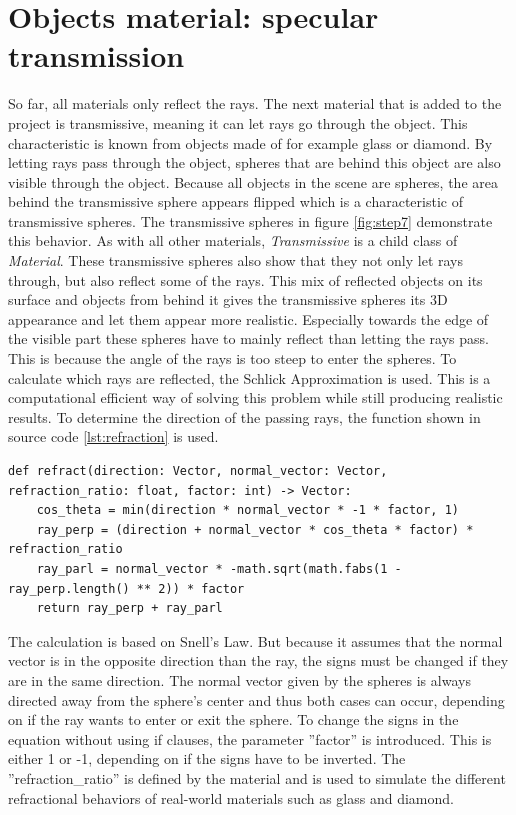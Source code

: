 \documentclass[12pt]{report}
\begin{document}
\chapter{Objects material: specular transmission}
\vspace*{-0.1cm}
So far, all materials only reflect the rays. The next material that is added to the project is transmissive, meaning it can let rays go through the object. This characteristic is known from objects made of for example glass or diamond. By letting rays pass through the object, spheres that are behind this object are also visible through the object. Because all objects in the scene are spheres, the area behind the transmissive sphere appears flipped which is a characteristic of transmissive spheres. The transmissive spheres in figure \ref{fig:step7} demonstrate this behavior. As with all other materials, \textit{Transmissive} is a child class of \textit{Material}. These transmissive spheres also show that they not only let rays through, but also reflect some of the rays. This mix of reflected objects on its surface and objects from behind it gives the transmissive spheres its 3D appearance and let them appear more realistic. Especially towards the edge of the visible part these spheres have to mainly reflect than letting the rays pass. This is because the angle of the rays is too steep to enter the spheres. To calculate which rays are reflected, the Schlick Approximation is used. This is a computational efficient way of solving this problem while still producing realistic results. To determine the direction of the passing rays, the function shown in source code \ref{lst:refraction} is used.
\begin{lstlisting}[caption={Calculating refracted ray}, label=lst:refraction, style=mystyle]
def refract(direction: Vector, normal_vector: Vector, refraction_ratio: float, factor: int) -> Vector:
    cos_theta = min(direction * normal_vector * -1 * factor, 1)
    ray_perp = (direction + normal_vector * cos_theta * factor) * refraction_ratio
    ray_parl = normal_vector * -math.sqrt(math.fabs(1 - ray_perp.length() ** 2)) * factor
    return ray_perp + ray_parl
\end{lstlisting}
The calculation is based on Snell's Law. But because it assumes that the normal vector is in the opposite direction than the ray, the signs must be changed if they are in the same direction. The normal vector given by the spheres is always directed away from the sphere's center and thus both cases can occur, depending on if the ray wants to enter or exit the sphere. To change the signs in the equation without using if clauses, the parameter ''factor'' is introduced. This is either 1 or -1, depending on if the signs have to be inverted. The ''refraction\_ratio'' is defined by the material and is used to simulate the different refractional behaviors of real-world materials such as glass and diamond.
\end{document}
